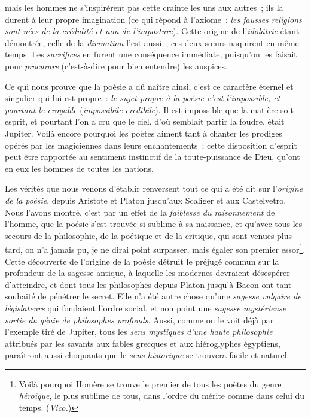 \documentclass[french,twoside]{book} %
\begin{document}
\noindent mais les hommes ne s’inspirèrent pas cette crainte les uns aux autres ; ils la durent à leur propre imagination (ce qui répond à l’axiome : {\itshape les fausses religions sont nées de la crédulité et non de l’imposture}). Cette origine de l’{\itshape idolâtrie} étant démontrée, celle de la {\itshape divination} l’est aussi ; ces deux sœurs naquirent en même temps. Les {\itshape sacrifices} en furent une conséquence immédiate, puisqu’on les faisait pour {\itshape procurare} (c’est-à-dire pour bien entendre) les auspices.\par
Ce qui nous prouve que la poésie a dû naître ainsi, c’est ce caractère éternel et singulier qui lui est propre : {\itshape le sujet propre à la poésie c’est l’impossible, et pourtant le croyable} ({\itshape impossibile credibile}). Il est impossible que la matière soit esprit, et pourtant l’on a cru que le ciel, d’où semblait partir la foudre, était Jupiter. Voilà encore pourquoi les poètes aiment tant à chanter les prodiges opérés par les magiciennes dans leurs enchantements ; cette disposition d’esprit peut être rapportée au sentiment instinctif de la toute-puissance de Dieu, qu’ont en eux les hommes de toutes les nations.\par
Les vérités que nous venons d’établir renversent tout ce qui a été dit sur l’{\itshape origine de la poésie}, depuis  Aristote et Platon jusqu’aux Scaliger et aux Castelvetro. Nous l’avons montré, c’est par un effet de la {\itshape faiblesse du raisonnement} de l’homme, que la poésie s’est trouvée si sublime à sa naissance, et qu’avec tous les secours de la philosophie, de la poétique et de la critique, qui sont venues plus tard, on n’a jamais pu, je ne dirai point surpasser, mais égaler son premier essor\footnote{Voilà pourquoi Homère se trouve le premier de tous les poètes du genre {\itshape héroïque}, le plus sublime de tous, dans l’ordre du mérite comme dans celui du temps. ({\itshape Vico.})}. Cette découverte de l’origine de la poésie détruit le préjugé commun sur la profondeur de la sagesse antique, à laquelle les modernes devraient désespérer d’atteindre, et dont tous les philosophes depuis Platon jusqu’à Bacon ont tant souhaité de pénétrer le secret. Elle n’a été autre chose qu’une {\itshape sagesse vulgaire de législateurs} qui fondaient l’ordre social, et non point une {\itshape sagesse mystérieuse sortie du génie de philosophes profonds}. Aussi, comme on le voit déjà par l’exemple tiré de Jupiter, tous les {\itshape sens mystiques d’une haute philosophie} attribués par les savants aux fables grecques et aux hiéroglyphes égyptiens, paraîtront aussi choquants que le {\itshape sens historique} se trouvera facile et naturel.
\end{document}
